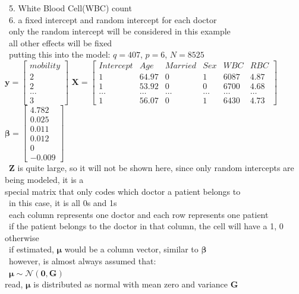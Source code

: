\documentclass[10pt,letterpaper]{scrartcl}
\newcommand{\tbul}{\textbullet}
\newcommand{\tend}{\>\textendash}
\begin{document}
\begin{tabbing}
	\>\ 5. White Blood Cell(WBC) count \\
	\>\ 6. a fixed intercept and random intercept for each doctor \\
	\tbul\ only the random intercept will be considered in this example \\
	\tbul\ all other effects will be fixed \\
	\tbul\ putting this into the model: $q = 407$, $p = 6$, $N = 8525$\\
	$\mathbf{y} = \begin{bmatrix} mobility \\ 2 \\ 2 \\ \ldots \\ 3 \end{bmatrix}$ 
	$\mathbf{X} = \begin{bmatrix} Intercept & Age    & Married & Sex    & WBC    & RBC    \\ 
	1         & 64.97  & 0       & 1      & 6087   & 4.87   \\
	1         & 53.92  & 0       & 0      & 6700   & 4.68   \\ 
	\ldots    & \ldots & \ldots  & \ldots & \ldots & \ldots \\ 
	1         & 56.07  & 0       & 1      & 6430   & 4.73   \end{bmatrix}$
	$\boldsymbol{\beta} = \begin{bmatrix} 4.782 \\ 0.025 \\ 0.011 \\ 0.012 \\ 0 \\ -0.009 \end{bmatrix}$ \\
	\tbul\ $\mathbf{Z}$ is quite large, so it will not be shown here, since only random intercepts are being modeled, it is a\\ special matrix that only codes which doctor a patient belongs to \\
	\tend\ in this case, it is all 0s and 1s \\
	\tend\ each column represents one doctor and each row represents one patient \\
	\tend\ if the patient belongs to the doctor in that column, the cell will have a 1, 0 otherwise \\
	\tbul\ if estimated, $\boldsymbol{\mu}$ would be a column vector, similar to $\boldsymbol{\beta}$ \\
	\tbul\ however, is almost always assumed that: \\
	\>\>\>\>\ $\boldsymbol{\mu} \sim \mathcal{N}(\mathbf{0}, \mathbf{G})$ \\ 
	read, $\boldsymbol{\mu}$ is distributed as normal with mean zero and variance $\mathbf{G}$ \\
\end{tabbing}
\end{document}
